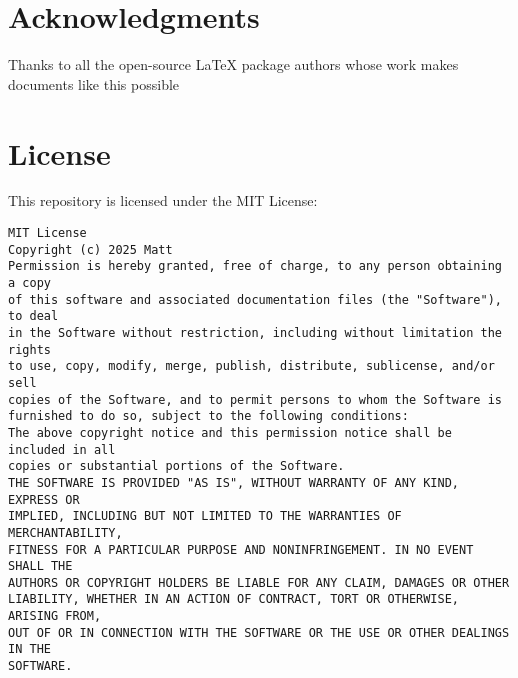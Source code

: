 \documentclass[nonacm, sigconf, balance=true]{acmart}
\begin{document}
    \section*{Acknowledgments}
    Thanks to all the open-source LaTeX package authors whose work makes documents like this possible

    \section*{License}
    This repository is licensed under the MIT License:
    \begin{verbatim}
MIT License
Copyright (c) 2025 Matt
Permission is hereby granted, free of charge, to any person obtaining a copy
of this software and associated documentation files (the "Software"), to deal
in the Software without restriction, including without limitation the rights
to use, copy, modify, merge, publish, distribute, sublicense, and/or sell
copies of the Software, and to permit persons to whom the Software is
furnished to do so, subject to the following conditions:
The above copyright notice and this permission notice shall be included in all
copies or substantial portions of the Software.
THE SOFTWARE IS PROVIDED "AS IS", WITHOUT WARRANTY OF ANY KIND, EXPRESS OR
IMPLIED, INCLUDING BUT NOT LIMITED TO THE WARRANTIES OF MERCHANTABILITY,
FITNESS FOR A PARTICULAR PURPOSE AND NONINFRINGEMENT. IN NO EVENT SHALL THE
AUTHORS OR COPYRIGHT HOLDERS BE LIABLE FOR ANY CLAIM, DAMAGES OR OTHER
LIABILITY, WHETHER IN AN ACTION OF CONTRACT, TORT OR OTHERWISE, ARISING FROM,
OUT OF OR IN CONNECTION WITH THE SOFTWARE OR THE USE OR OTHER DEALINGS IN THE
SOFTWARE.
    \end{verbatim}

\end{document}
